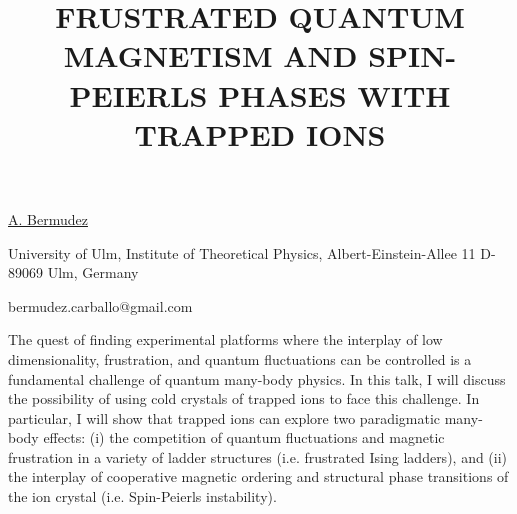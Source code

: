 \title{FRUSTRATED QUANTUM MAGNETISM AND SPIN-PEIERLS PHASES WITH TRAPPED IONS}

\underline{A. Bermudez} 

{\normalsize{\vspace{-4mm}
University of Ulm,
Institute of Theoretical Physics,
Albert-Einstein-Allee 11
D-89069 Ulm, Germany

\email bermudez.carballo@gmail.com}}

The quest of finding experimental platforms where the interplay of low dimensionality, frustration, and quantum fluctuations can be
controlled is a fundamental challenge of quantum many-body physics. In this talk, I will discuss the possibility of using cold crystals
of trapped ions to face this challenge. In particular, I will show that trapped ions can explore two paradigmatic many-body effects: (i)
the competition of quantum fluctuations and magnetic frustration in a variety of ladder structures (i.e. frustrated Ising ladders), and
(ii) the interplay of cooperative magnetic ordering and structural phase transitions of the ion crystal (i.e. Spin-Peierls instability).

\vspace{\baselineskip} 